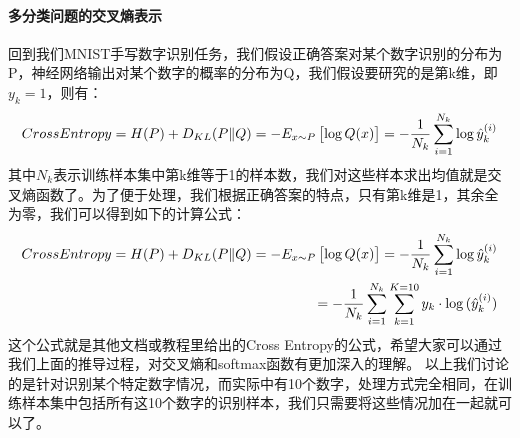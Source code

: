 \documentclass[UTF8]{article}
\begin{document}
\paragraph{多分类问题的交叉熵表示}
回到我们MNIST手写数字识别任务，我们假设正确答案对某个数字识别的分布为P，神经网络输出对某个数字的概率的分布为Q，我们假设要研究的是第k维，即$y_k=1$，则有：
\begin{equation}
\begin{aligned}
CrossEntropy=H(P) + D_{KL}(P \Vert Q)=-E_{\boldmath{x} \sim P}\begin{bmatrix}
\log{Q(x)}
\end{bmatrix}=-\frac{1}{N_k}\sum_{i=1}^{N_k}\log{\hat{y}^{(i)}_k}
\end{aligned}
\label{mlp-mnist-crossentropy-def}
\end{equation}
其中$N_k$表示训练样本集中第k维等于1的样本数，我们对这些样本求出均值就是交叉熵函数了。为了便于处理，我们根据正确答案的特点，只有第k维是1，其余全为零，我们可以得到如下的计算公式：
\begin{equation}
\begin{aligned}
CrossEntropy=H(P) + D_{KL}(P \Vert Q)=-E_{\boldmath{x} \sim P}\begin{bmatrix}
\log{Q(x)}
\end{bmatrix}=-\frac{1}{N_k}\sum_{i=1}^{N_k}\log{\hat{y}^{(i)}_k}\\
=-\frac{1}{N_k}\sum_{i=1}^{N_k}\sum_{k=1}^{K=10}y_k \cdot \log{(\hat{y}^{(i)}_k)}
\end{aligned}
\label{mlp-mnist-crossentropy-formula}
\end{equation}
这个公式就是其他文档或教程里给出的Cross Entropy的公式，希望大家可以通过我们上面的推导过程，对交叉熵和softmax函数有更加深入的理解。\newline
以上我们讨论的是针对识别某个特定数字情况，而实际中有10个数字，处理方式完全相同，在训练样本集中包括所有这10个数字的识别样本，我们只需要将这些情况加在一起就可以了。
\end{document}
